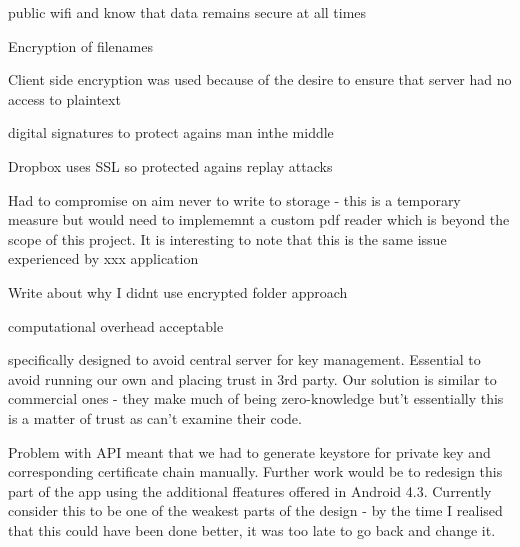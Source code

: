 public wifi and know that data remains secure at all times

 Encryption of filenames
 
 Client side encryption was used because of the desire to ensure that server had no access to plaintext
 
 digital signatures to protect agains man inthe middle
 
 Dropbox uses SSL so protected agains replay attacks
 
 Had to compromise on aim never to write to storage - this is a temporary measure but would need to implememnt a custom pdf reader which is beyond the scope of this project.  It is interesting to note that this is the same issue experienced by xxx application
 
 Write about why I didnt use encrypted folder approach
 
 computational overhead acceptable  
 
 
 specifically designed to avoid central server for key management.  Essential to avoid running our own and placing trust in 3rd party.  Our solution is similar to commercial ones - they make much of being zero-knowledge but't  essentially this is a matter of trust as can't examine their code.
 
 Problem with API meant that we had to generate keystore for private key and corresponding certificate chain manually.  Further work would be to redesign this part of the app using the additional ffeatures offered in Android 4.3.  Currently consider this to be one of the weakest parts of the design - by the time I realised that this could have been done better, it was too late to go back and change it.
 
 
 
 

